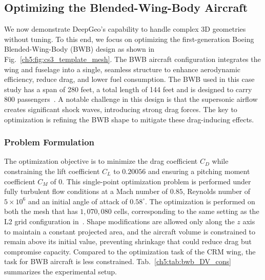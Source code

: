 \subsection{Optimizing the Blended-Wing-Body Aircraft}
\label{ch5:sec:cs3}

We now demonstrate DeepGeo's capability to handle complex 3D geometries without tuning. To this end, we focus on optimizing the first-generation Boeing Blended-Wing-Body (BWB) design as shown in Fig.~\ref{ch5:fig:cs3_template_mesh}. The BWB aircraft configuration integrates the wing and fuselage into a single, seamless structure to enhance aerodynamic efficiency, reduce drag, and lower fuel consumption. The BWB used in this case study has a span of 280 feet, a total length of 144 feet and is designed to carry 800 passengers~\cite{aa.Liebeck2004}.
A notable challenge in this design is that the supersonic airflow creates significant shock waves, introducing strong drag forces. The key to optimization is refining the BWB shape to mitigate these drag-inducing effects.



\subsubsection{Problem Formulation}

The optimization objective is to minimize the drag coefficient $C_D$ while constraining the lift coefficient $C_L$ to $0.20056$ and ensuring a pitching moment coefficient $C_M$ of 0. This single-point optimization problem is performed under fully turbulent flow conditions at a Mach number of $0.85$, Reynolds number of $5\times10^6$ and an initial angle of attack of $0.58^{\circ}$. The optimization is performed on both the mesh that has $1,070,080$ cells, corresponding to the same setting as the L2 grid configuration in~\citet{aa.Lyu2014}. Shape modifications are allowed only along the $z$ axis to maintain a constant projected area, and the aircraft volume is constrained to remain above its initial value, preventing shrinkage that could reduce drag but compromise capacity. Compared to the optimization task of the CRM wing, the task for BWB aircraft is less constrained. Tab.~\ref{ch5:tab:bwb_DV_cons} summarizes the experimental setup. 

